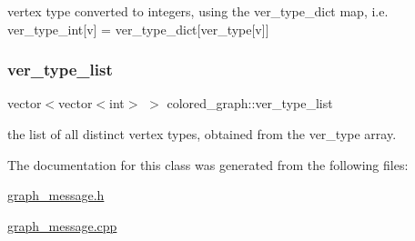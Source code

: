 vertex type converted to integers, using the ver\+\_\+type\+\_\+dict map, i.\+e. ver\+\_\+type\+\_\+int\mbox{[}v\mbox{]} = ver\+\_\+type\+\_\+dict\mbox{[}ver\+\_\+type\mbox{[}v\mbox{]}\mbox{]} 

\mbox{\label{classcolored__graph_a3a1ae8abac458d20a2afb4aa48bbc956}} 
\subsubsection{\texorpdfstring{ver\+\_\+type\+\_\+list}{ver\_type\_list}}
{\footnotesize\ttfamily vector$<$vector$<$int$>$ $>$ colored\+\_\+graph\+::ver\+\_\+type\+\_\+list}



the list of all distinct vertex types, obtained from the ver\+\_\+type array. 



The documentation for this class was generated from the following files\+:\begin{DoxyCompactItemize}
\item 
\hyperlink{graph__message_8h}{graph\+\_\+message.\+h}\item 
\hyperlink{graph__message_8cpp}{graph\+\_\+message.\+cpp}\end{DoxyCompactItemize}
